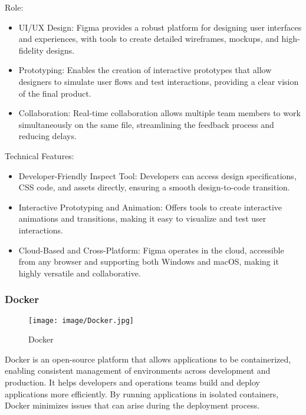 \documentclass[conference]{IEEEtran}
\begin{document}
Role:
\begin{itemize}
    \item UI/UX Design: Figma provides a robust platform for designing user interfaces and experiences, with tools to create detailed wireframes, mockups, and high-fidelity designs.\\
    \item Prototyping: Enables the creation of interactive prototypes that allow designers to simulate user flows and test interactions, providing a clear vision of the final product.\\
    \item Collaboration: Real-time collaboration allows multiple team members to work simultaneously on the same file, streamlining the feedback process and reducing delays.\\
\end{itemize}

Technical Features:
\begin{itemize}
    \item Developer-Friendly Inspect Tool: Developers can access design specifications, CSS code, and assets directly, ensuring a smooth design-to-code transition.\\
    \item Interactive Prototyping and Animation: Offers tools to create interactive animations and transitions, making it easy to visualize and test user interactions.\\
    \item Cloud-Based and Cross-Platform: Figma operates in the cloud, accessible from any browser and supporting both Windows and macOS, making it highly versatile and collaborative.\\
\end{itemize}


\subsubsection{Docker}

\begin{figure}[h!]
    \centering
    \texttt{[image: image/Docker.jpg]}
    \caption{Docker}
    \label{fig:enter-label}
\end{figure}

\noindent Docker is an open-source platform that allows applications to be containerized, enabling consistent management of environments across development and production. It helps developers and operations teams build and deploy applications more efficiently. By running applications in isolated containers, Docker minimizes issues that can arise during the deployment process.\\
\end{document}
